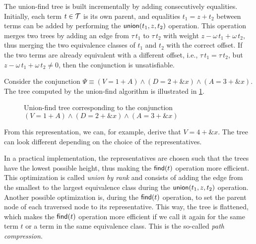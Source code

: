 The union-find tree is built incrementally by adding consecutively equalities.
Initially, each term $t\in\mathcal{T}$ is its own parent, and equalities $t_1 = z + t_2$ between terms can be added by performing the $\textsf{union}(t_1, z, t_2)$ operation.
This operation merges two trees by adding an edge from $\tau\,t_1$ to $\tau\,t_2$ with weight $z - \omega\,t_1 + \omega\,t_2$,
thus merging the two equivalence classes of $t_1$ and $t_2$ with the correct offset.
If the two terms are already equivalent with a different offset, i.e., $\tau\,t_1 = \tau\,t_2$, but $z - \omega\,t_1 + \omega\,t_2 \neq 0$, then the conjunction is unsatisfiable.

\begin{example}
  Consider the conjunction $\Psi \equiv (V = 1 + A) \land (D = 2 + \&x) \land (A = 3 + \&x)$.
  The tree computed by the union-find algorithm is illustrated in \cref{fig:uf-tree}.
  \begin{figure}
    \centering
    \caption[An example of a union-find tree.]{Union-find tree corresponding to the conjunction  $(V = 1 + A) \land (D = 2 + \&x) \land (A = 3 + \&x)$}\label{fig:uf-tree}
  \end{figure}
  From this representation, we can, for example, derive that $V = 4 + \&x$.
  The tree can look different depending on the choice of the representatives.
\end{example}

In a practical implementation, the representatives are chosen such that the trees have the lowest possible height, thus making the $\textsf{find}(t)$ operation more efficient.
This optimization is called \emph{union by rank} and consists of adding the edge from the smallest to the largest equivalence class during the $\textsf{union}(t_1, z, t_2)$ operation.
Another possible optimization is, during the $\textsf{find}(t)$ operation, to set the parent node of each traversed node to its representative.
This way, the tree is flattened, which makes the $\textsf{find}(t)$ operation
more efficient if we call it again for the same term $t$ or a term in the same equivalence class.
This is the so-called \emph{path compression}.~\cite{uf-tarjan}

